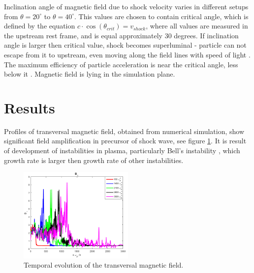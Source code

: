 \documentclass[a4paper]{jpconf}
\begin{document}
	Inclination angle of magnetic field due to shock velocity varies in different setups from $\theta = 20^\circ$ to $\theta = 40^\circ$. This values are chosen to contain critical angle, which is defined by the equation $c\cdot \cos(\theta_{crit})=v_{shock}$, where all values are measured in the upstream rest frame, and is equal approximately $30$ degrees. If inclination angle is larger then critical value, shock becomes superluminal - particle can not escape from it to upstream, even moving along the field lines with speed of light \cite{Pelletier2017,Sironi2011}. The maximum efficiency of particle acceleration is near the critical angle, less below it \cite{Romansky18}. Magnetic field is lying in the simulation plane.
	
	
	\section{Results}
	
	Profiles of transversal magnetic field, obtained from numerical simulation, show significant field amplification in precursor of shock wave, see figure \ref{field}. It is result of development of instabilities in plasma, particularly Bell's instability \cite{Bell04}, which growth rate is larger then growth rate of other instabilities.
	
	\begin{figure}[h!]
		\centering
		\includegraphics[width=0.50\textwidth]{fig/Bnorm.png} 
		\caption{Temporal evolution of the transversal magnetic field.}
		\label{field}
	\end{figure}
	
\end{document}
